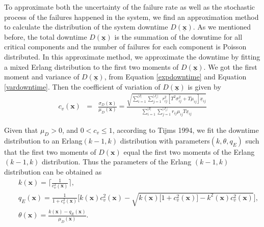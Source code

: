 \documentclass[preprint,12pt]{elsarticle}
\begin{document}
To approximate both the uncertainty of the failure rate as well as the stochastic process of the failures happened in the system, we find an approximation method to calculate the distribution of the system downtime $D(\underline{\boldsymbol{x}})$. As we mentioned before, the total downtime $D(\underline{\boldsymbol{x}})$ is the summation of the downtime for all critical components and the number of failures for each component is Poisson distributed. In this approximate method, we approximate the downtime by fitting a mixed Erlang distribution to the first two moments of $D(\underline{\boldsymbol{x}})$. We got the first moment and variance of $D(\underline{\boldsymbol{x}})$, from Equation \eqref{expdowntime} and Equation \eqref{vardowntime}. Then the coefficient of variation of $D(\underline{\boldsymbol{x}})$ is given by
\begin{eqnarray}
c_{v}(\boldsymbol{x}) &=& \frac{\sigma_{D}(\boldsymbol{x})}{\mu_{D}(\boldsymbol{x})} = \frac{\sqrt{\sum_{i=1}^{\lvert I \rvert}\sum_{j=1}^{\lvert J_{i} \rvert}r_{ij}^{2}[T^{2}\sigma^{2}_{ij}+T\mu_{ij}]\underline{x}_{ij}}}{\sum^{\lvert I \rvert}_{i=1} \sum_{j=1}^{\lvert J_{i} \rvert}{r_{ij}\mu_{ij}T\underline{x}_{ij}}} \label{cv}
\end{eqnarray}


Given that $\mu_{D}>0$, and $0<c_{v}\leq 1$, according to Tijms 1994, we fit the downtime distribution to an Erlang$(k-1,k)$ distribution with parameters$(k,\theta,q_{E})$ such that the first two moments of $D(\boldsymbol{x})$ equal the first two moments of the Erlang $(k-1,k)$ distribution. Thus the parameters of the Erlang $(k-1,k)$ distribution can be obtained as
\begin{eqnarray}
&&k(\boldsymbol{x}) = \lceil \frac{1}{c_{v}^{2}(\boldsymbol{x})} \rceil, \label{k1}\\
&&q_{E}(\boldsymbol{x})= \frac{1}{1+c^{2}_{v}(\boldsymbol{x})}\bigg[k(\boldsymbol{x})c^{2}_{v}(\boldsymbol{x})-\sqrt{k(\boldsymbol{x})\big[1+c^{2}_{v}(\boldsymbol{x})\big]-k^{2}(\boldsymbol{x})c^{2}_{v}(\boldsymbol{x})} \bigg], \label{q1}\\
&&\theta(\boldsymbol{x}) = \frac{k(\boldsymbol{x})-q_{E}(\boldsymbol{x})}{\mu_{D}(\boldsymbol{x})}. \label{theta1}
\end{eqnarray}
\end{document}
